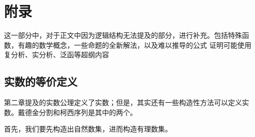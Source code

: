 \documentclass[12pt, a4paper, oneside, UTF8]{ctexbook}
\begin{document}
	\else
	\fi
	\chapter{附录}
	这一部分中，对于正文中因为逻辑结构无法提及的部分，进行补充。包括特殊函数，有趣的数学概念，一些命题的全新解法，以及难以推导的公式
	证明可能使用复分析、实分析、泛函等超纲内容
	
	\section{实数的等价定义}
	第二章提及的实数公理定义了实数；但是，其实还有一些构造性方法可以定义实数。戴德金分割和柯西序列是其中的两个。
	
	首先，我们要先构造出自然数集，进而构造有理数集。
\end{document}

